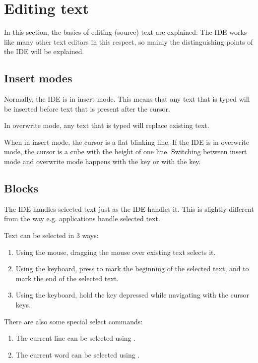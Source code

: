 \section{Editing text}
\label{se:editingtext}
In this section, the basics of editing (source) text are explained. The IDE
works like many other text editors in this respect, so mainly the
distinguishing points of the IDE will be explained.

\subsection{Insert modes}
Normally, the IDE is in insert mode. This means that any text that is typed
will be inserted before text that is present after the cursor.

In overwrite mode, any text that is typed will replace existing text.

When in insert mode, the cursor is a flat blinking line. If the IDE is in
overwrite mode, the cursor is a cube with the height of one line. Switching between
insert mode and overwrite mode happens with the  key or with the
 key.
%
%
\subsection{Blocks}
\label{se:blocks}
The IDE handles selected text just as the \tp IDE handles it. This is
slightly different from the way e.g. \windows applications handle selected
text.

Text can be selected in 3 ways:
\begin{enumerate}
\item Using the mouse, dragging the mouse over existing text selects it.
\item Using the keyboard, press  to mark the beginning of
the selected text, and  to mark the end of the selected
text.
\item Using the keyboard, hold the  key depressed while
navigating with the cursor keys.
\end{enumerate}

There are also some special select commands:
\begin{enumerate}
\item The current line can be selected using .
\item The current word can be selected using .
\end{enumerate}

